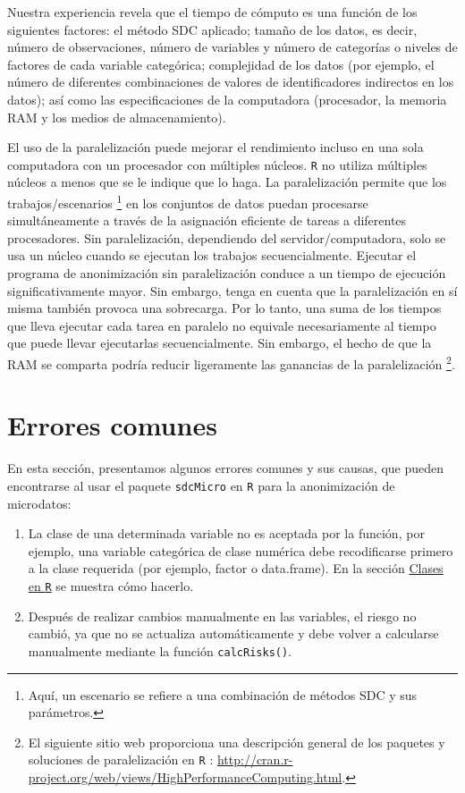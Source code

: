 \documentclass[
]{book}
\theoremstyle{definition}
\theoremstyle{definition}
\theoremstyle{definition}
\theoremstyle{definition}
\theoremstyle{remark}
\begin{document}
Nuestra experiencia revela que el tiempo de cómputo es una función de los siguientes factores: el método SDC aplicado; tamaño de los datos, es decir, número de observaciones, número de variables y número de categorías o niveles de factores de cada variable categórica; complejidad de los datos (por ejemplo, el número de diferentes combinaciones de valores de identificadores indirectos en los datos); así como las especificaciones de la computadora (procesador, la memoria RAM y los medios de almacenamiento).

El uso de la paralelización puede mejorar el rendimiento incluso en una sola computadora con un procesador con múltiples núcleos. \texttt{R} no utiliza múltiples núcleos a menos que se le indique que lo haga. La paralelización permite que los trabajos/escenarios \footnote{Aquí, un escenario se refiere a una combinación de métodos SDC y sus parámetros.} en los conjuntos de datos puedan procesarse simultáneamente a través de la asignación eficiente de tareas a diferentes procesadores. Sin paralelización, dependiendo del servidor/computadora, solo se usa un núcleo cuando se ejecutan los trabajos secuencialmente. Ejecutar el programa de anonimización sin paralelización conduce a un tiempo de ejecución significativamente mayor. Sin embargo, tenga en cuenta que la paralelización en sí misma también provoca una sobrecarga. Por lo tanto, una suma de los tiempos que lleva ejecutar cada tarea en paralelo no equivale necesariamente al tiempo que puede llevar ejecutarlas secuencialmente. Sin embargo, el hecho de que la RAM se comparta podría reducir ligeramente las ganancias de la paralelización \footnote{El siguiente sitio web proporciona una descripción general de los paquetes y soluciones de paralelización en \texttt{R} : \url{http://cran.r-project.org/web/views/HighPerformanceComputing.html}.}.

\hypertarget{errores-comunes}{%
\section{Errores comunes}\label{errores-comunes}}

En esta sección, presentamos algunos errores comunes y sus causas, que pueden encontrarse al usar el paquete \texttt{sdcMicro} en \texttt{R} para la anonimización de microdatos:

\begin{enumerate}
\def\labelenumi{\arabic{enumi}.}
\item
  La clase de una determinada variable no es aceptada por la función, por ejemplo, una variable categórica de clase numérica debe recodificarse primero a la clase requerida (por ejemplo, factor o data.frame). En la sección \protect\hyperlink{clases-en-r}{Clases en \texttt{R}} se muestra cómo hacerlo.
\item
  Después de realizar cambios manualmente en las variables, el riesgo no cambió, ya que no se actualiza automáticamente y debe volver a calcularse manualmente mediante la función \texttt{calcRisks()}.
\end{enumerate}
\end{document}
